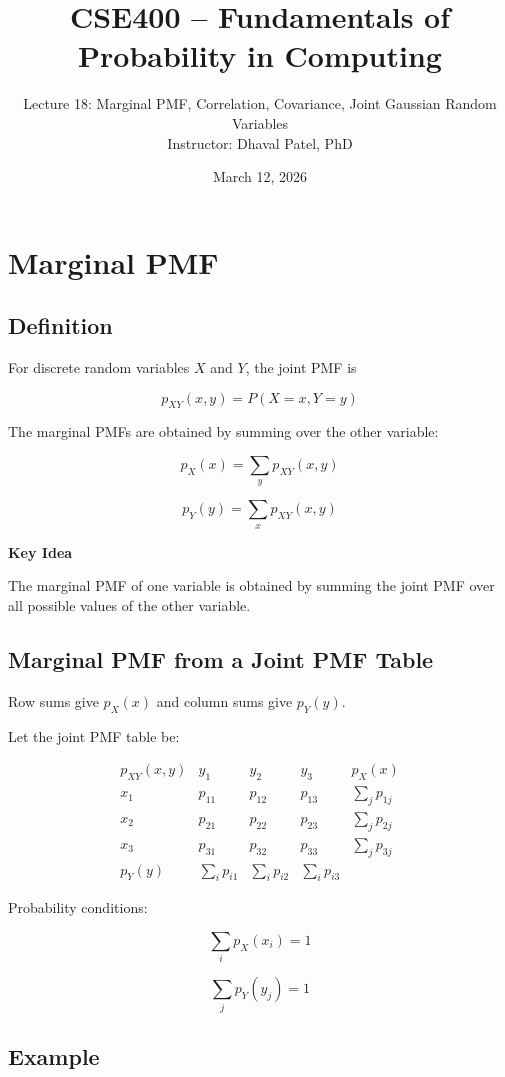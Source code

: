 \documentclass{article}
\title{CSE400 – Fundamentals of Probability in Computing}
\author{Lecture 18: Marginal PMF, Correlation, Covariance, Joint Gaussian Random Variables\\
Instructor: Dhaval Patel, PhD}
\date{March 12, 2026}
\begin{document}
\maketitle

\section{Marginal PMF}

\subsection{Definition}

For discrete random variables $X$ and $Y$, the joint PMF is

\[
p_{XY}(x,y) = P(X=x, Y=y)
\]

The marginal PMFs are obtained by summing over the other variable:

\[
p_X(x) = \sum_y p_{XY}(x,y)
\]

\[
p_Y(y) = \sum_x p_{XY}(x,y)
\]

\textbf{Key Idea}

The marginal PMF of one variable is obtained by summing the joint PMF over all possible values of the other variable.

\subsection{Marginal PMF from a Joint PMF Table}

Row sums give $p_X(x)$ and column sums give $p_Y(y)$.

Let the joint PMF table be:

\[
\begin{array}{c|ccc|c}
p_{XY}(x,y) & y_1 & y_2 & y_3 & p_X(x) \\
\hline
x_1 & p_{11} & p_{12} & p_{13} & \sum_j p_{1j} \\
x_2 & p_{21} & p_{22} & p_{23} & \sum_j p_{2j} \\
x_3 & p_{31} & p_{32} & p_{33} & \sum_j p_{3j} \\
\hline
p_Y(y) & \sum_i p_{i1} & \sum_i p_{i2} & \sum_i p_{i3} &
\end{array}
\]

Probability conditions:

\[
\sum_i p_X(x_i) = 1
\]

\[
\sum_j p_Y(y_j) = 1
\]

\subsection{Example}
\end{document}

